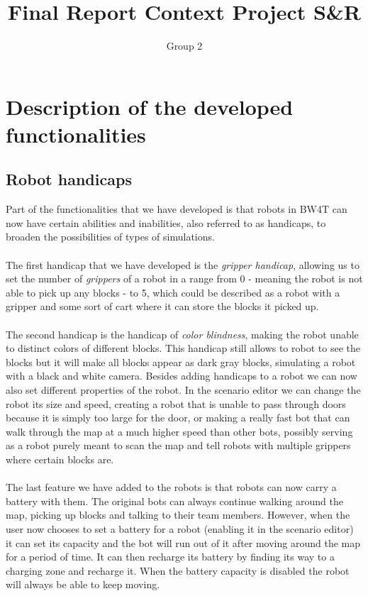 \documentclass[]{article}
\title{Final Report Context Project S\&R}
\author{Group 2}
\begin{document}
\maketitle
\section*{Description of the developed functionalities}
\subsection*{Robot handicaps}
Part of the functionalities that we have developed is that robots in BW4T can now have certain abilities and inabilities, also referred to as handicaps, to broaden the possibilities of types of simulations.\\
\\
The first handicap that we have developed is the \textit{gripper handicap}, allowing us to set the number of \textit{grippers} of a robot in a range from 0 - meaning the robot is not able to pick up any blocks - to 5, which could be described as a robot with a gripper and some sort of cart where it can store the blocks it picked up.\\
\\
The second handicap is the handicap of \textit{color blindness}, making the robot unable to distinct colors of different blocks. This handicap still allows to robot to see the blocks but it will make all blocks appear as dark gray blocks, simulating a robot with a black and white camera.
Besides adding handicaps to a robot we can now also set different properties of the robot. In the scenario editor we can change the robot its size and speed, creating a robot that is unable to pass through doors because it is simply too large for the door, or making a really fast bot that can walk through the map at a much higher speed than other bots, possibly serving as a robot purely meant to scan the map and tell robots with multiple grippers where certain blocks are.\\
\\
The last feature we have added to the robots is that robots can now carry a battery with them. The original bots can always continue walking around the map, picking up blocks and talking to their team members. However, when the user now chooses to set a battery for a robot (enabling it in the scenario editor) it can set its capacity and the bot will run out of it after moving around the map for a period of time. It can then recharge its battery by finding its way to a charging zone and recharge it. When the battery capacity is disabled the robot will always be able to keep moving.
\end{document}
